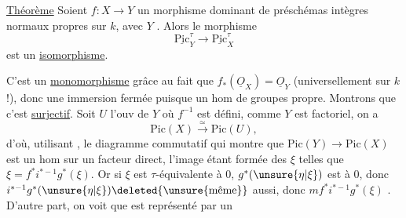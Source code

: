 \uline{Théorème} Soient $f:X\to Y$ un morphisme  dominant
de préschémas intègres normaux  propres sur $k$,
avec $Y$ .
Alors le morphisme
\[
\underline{\mathrm{Pic}}_Y^\tau\longrightarrow
\underline{\mathrm{Pic}}_X^\tau
\]
est un \uline{isomorphisme}.


C'est un \uline{monomorphisme} grâce au fait que
$f_*(\underline O_X)=\underline O_Y$ (universellement sur $k$ !),
donc une immersion fermée puisque un hom de groupes
 propre.
Montrons que c'est \uline{surjectif}.
Soit $U$ l'ouv de $Y$ où $f^{-1}$ est défini,
comme $Y$ est factoriel, on a
\[
\mathrm{Pic}(X)\xrightarrow{\simeq}\mathrm{Pic}(U),
\]
d'où, utilisant
,
le diagramme commutatif
qui montre que $\mathrm{Pic}(Y)\to\mathrm{Pic}(X)$ est un hom
sur un facteur direct, l'image étant formée des $\xi$ telles que
$\xi=f^*i^{*-1}g^*(\xi)$.
Or si $\xi$ est  $\tau$-équivalente à $0$,
$g^*(\unsure{\eta|\xi})$ est
 à $0$,
donc $i^{*-1}g^*(\unsure{\eta|\xi})\deleted{\text{\unsure{même}}}$ aussi,
donc $mf^*i^{*-1}g^*(\xi)$
.
D'autre part, on voit que
est représenté par un

